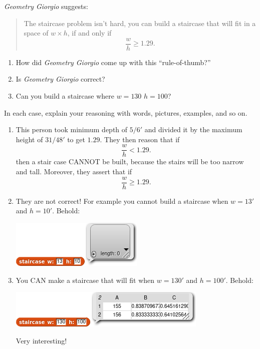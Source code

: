 \documentclass[noauthor,nooutcomes,12pt,handout]{ximera}
\begin{document}
\begin{question}
  \textit{Geometry Giorgio} suggests:
  \begin{quote}
    The staircase problem isn't hard, you can build a staircase that
    will fit in a space of $w\times h$, if and only if
    \[
    \frac{w}{h} \ge 1.29.
    \]
  \end{quote}
  \begin{enumerate}
    \item How did \textit{Geometry Giorgio} come up with this ``rule-of-thumb?''
    \item Is \textit{Geometry Giorgio} correct?
    \item Can you build a staircase where $w=130$ $h=100$? 
  \end{enumerate}
  In each case, explain your reasoning with words, pictures, examples, and so on.
  \begin{freeResponse}
    \begin{enumerate}
    \item This person took minimum depth of $5/6'$ and divided it by
      the maximum height of $31/48'$ to get $1.29$. They then reason that if
      \[
      \frac{w}{h} <1.29.
      \]
      then a stair case CANNOT be built, because the stairs will be
      too narrow and tall. Moreover, they assert that if
      \[
      \frac{w}{h} \ge 1.29.
      \]
    \item They are not correct! For example you cannot build a
      staircase when $w=13'$ and $h=10'$. Behold:
      \begin{center}
        \includegraphics{answer-13-10-result.png}
      \end{center}

    \item You CAN make a staircase that will fit when $w=130'$ and
      $h=100'$. Behold:
      \begin{center}
        \includegraphics{answer-130-100-result.png}
      \end{center}
      Very interesting!
    \end{enumerate}
  \end{freeResponse}
\end{question}
\end{document}

